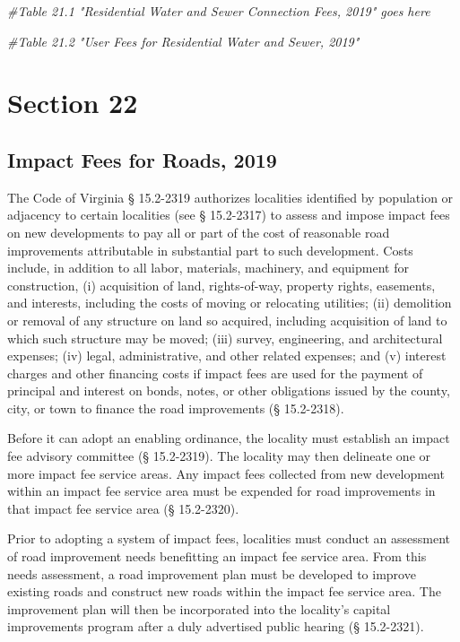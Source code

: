 \documentclass[
]{book}
\newenvironment{Shaded}{\begin{snugshade}}{\end{snugshade}}
\newcommand{\CommentTok}[1]{\textcolor[rgb]{0.56,0.35,0.01}{\textit{#1}}}
\begin{document}
\begin{Shaded}
\begin{Highlighting}[]
\CommentTok{\#Table 21.1 "Residential Water and Sewer Connection Fees, 2019" goes here}

\CommentTok{\#Table 21.2 "User Fees for Residential Water and Sewer, 2019"}
\end{Highlighting}
\end{Shaded}

\hypertarget{section-22}{%
\chapter{Section 22}\label{section-22}}

\hypertarget{impact-fees-for-roads-2019}{%
\section{Impact Fees for Roads, 2019}\label{impact-fees-for-roads-2019}}

The Code of Virginia § 15.2-2319 authorizes localities identified by population or adjacency to certain localities (see § 15.2-2317) to assess and impose impact fees on new developments to pay all or part of the cost of reasonable road improvements attributable in substantial part to such development. Costs include, in addition to all labor, materials, machinery, and equipment for construction, (i) acquisition of land, rights-of-way, property rights, easements, and interests, including the costs of moving or relocating utilities; (ii) demolition or removal of any structure on land so acquired, including acquisition of land to which such structure may be moved; (iii) survey, engineering, and architectural expenses; (iv) legal, administrative, and other related expenses; and (v) interest charges and other financing costs if impact fees are used for the payment of principal and interest on bonds, notes, or other obligations issued by the county, city, or town to finance the road improvements (§ 15.2-2318).

Before it can adopt an enabling ordinance, the locality must establish an impact fee advisory committee (§ 15.2-2319). The locality may then delineate one or more impact fee service areas. Any impact fees collected from new development within an impact fee service area must be expended for road improvements in that impact fee service area (§ 15.2-2320).

Prior to adopting a system of impact fees, localities must conduct an assessment of road improvement needs benefitting an impact fee service area. From this needs assessment, a road improvement plan must be developed to improve existing roads and construct new roads within the impact fee service area. The improvement plan will then be incorporated into the locality's capital improvements program after a duly advertised public hearing (§ 15.2-2321).
\end{document}
